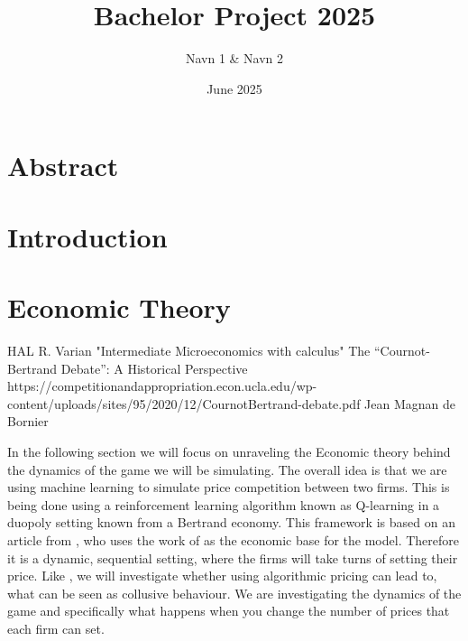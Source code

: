\documentclass{article}
\title{Bachelor Project 2025}
\author{Navn 1 & Navn 2}
\date{June 2025}
\begin{document}
\maketitle
{}
\setcounter{page}{1} 

\newpage
\section*{Abstract}



\newpage
\tableofcontents
\newpage

\setcounter{page}{1} 

\section{Introduction}

\section{Economic Theory}
HAL R. Varian "Intermediate Microeconomics with calculus"
\newline 
The “Cournot-Bertrand Debate”:
A Historical Perspective 
https://competitionandappropriation.econ.ucla.edu/wp-content/uploads/sites/95/2020/12/CournotBertrand-debate.pdf
Jean Magnan de Bornier 
\newline

In the following section we will focus on unraveling the Economic theory behind the dynamics of the game we will be simulating. 
The overall idea is that we are using machine learning to simulate price competition between two firms. This is being done using a reinforcement learning algorithm known as Q-learning in a duopoly setting known from a Bertrand economy. This framework is based on an article from \cite{Klein2021}, who uses the work of \cite{MaskinTirole} as the economic base for the model. Therefore it is a dynamic, sequential setting, where the firms will take turns of setting their price.
Like \cite{Klein2021}, we will investigate whether using algorithmic pricing can lead to, what can be seen as collusive behaviour.
\newline
We are investigating the dynamics of the game and specifically what happens when you change the number of prices that each firm can set.
\newline
\end{document}
